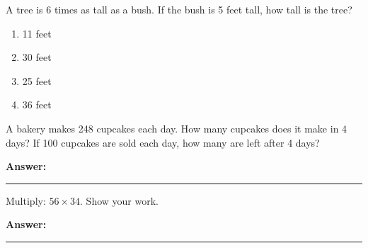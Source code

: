 \documentclass[12pt]{article}
\begin{document}
\begin{tcolorbox}[colframe=black!50, colback=white, title=\textbf{Problem 8}]
A tree is 6 times as tall as a bush. If the bush is 5 feet tall, how tall is the tree?
\begin{enumerate}[label=(\Alph*)]
    \item 11 feet
    \item 30 feet
    \item 25 feet
    \item 36 feet
\end{enumerate}
\end{tcolorbox}

\begin{tcolorbox}[colframe=black!50, colback=white, title=\textbf{Problem 9}]
A bakery makes 248 cupcakes each day. How many cupcakes does it make in 4 days? If 100 cupcakes are sold each day, how many are left after 4 days?

\vspace{4cm}
\textbf{Answer:}  
\rule{0.7\textwidth}{0.4mm}
\end{tcolorbox}

\begin{tcolorbox}[colframe=black!50, colback=white, title=\textbf{Problem 10}]
Multiply: \(56 \times 34\). Show your work.

\vspace{5cm}
\textbf{Answer:}  
\rule{0.7\textwidth}{0.4mm}
\end{tcolorbox}
\end{document}
